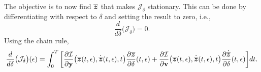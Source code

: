 \documentclass[3p,computermodern,10pt]{elsarticle}
\begin{document}
\begin{appendices}
$$$$
The objective is to now find $\overline{\boldsymbol z}$ that makes
$\mathcal{J}_{\delta}$ stationary. This can be done by differentiating with
respect to $\delta$ and setting the result to zero, i.e., %
\begin{equation}\label{eq:stationaryOne}
\frac{d}{d\delta} \big( \mathcal{J}_{\delta} \big)=  0.
\end{equation}
Using the chain rule,
$$ 
\frac{d}{d\delta} \big( \mathcal{J}_{\delta} \big)(\epsilon)= 
\int_0^T \bigg[ \frac{\partial \mathcal{I}  }{\partial \mathbf{y} } \big(\overline{\boldsymbol z}(t,\epsilon),\dot{\overline{\boldsymbol z}}(t,\epsilon) ,t\big) \frac{\partial \overline{\boldsymbol z} }{\partial \delta}(t,\epsilon)  + \frac{\partial \mathcal{I}}{\partial \mathbf{{v}} } \big(\overline{\boldsymbol z}(t,\epsilon),\dot{\overline{\boldsymbol z}}(t,\epsilon) ,t \big) \frac{\partial \dot{\overline{\boldsymbol z}}}{\partial \delta} (t,\epsilon)\bigg]dt . $$

\end{appendices}
\end{document}

